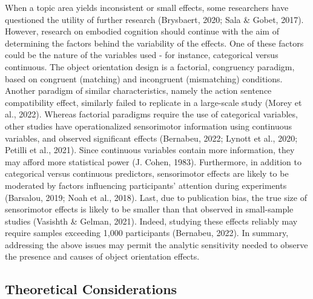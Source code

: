 \documentclass[
  man,floatsintext]{apa7}
\begin{document}
When a topic area yields inconsistent or small effects, some researchers
have questioned the utility of further research (Brysbaert, 2020; Sala \& Gobet, 2017). However, research on embodied cognition should continue with
the aim of determining the factors behind the variability of the
effects. One of these factors could be the nature of the variables
used - for instance, categorical versus continuous. The object
orientation design is a factorial, congruency paradigm, based on
congruent (matching) and incongruent (mismatching) conditions. Another
paradigm of similar characteristics, namely the action sentence
compatibility effect, similarly failed to replicate in a large-scale
study (Morey et al., 2022). Whereas factorial paradigms require the use of
categorical variables, other studies have operationalized sensorimotor
information using continuous variables, and observed significant effects
(Bernabeu, 2022; Lynott et al., 2020; Petilli et al., 2021). Since continuous variables
contain more information, they may afford more statistical power
(J. Cohen, 1983). Furthermore, in addition to categorical versus continuous
predictors, sensorimotor effects are likely to be moderated by factors
influencing participants' attention during experiments
(Barsalou, 2019; Noah et al., 2018). Last, due
to publication bias, the true size of sensorimotor effects is likely to
be smaller than that observed in small-sample studies (Vasishth \& Gelman, 2021).
Indeed, studying these effects reliably may require samples exceeding
1,000 participants (Bernabeu, 2022). In summary, addressing the above
issues may permit the analytic sensitivity needed to observe the
presence and causes of object orientation effects.

\hypertarget{theoretical-considerations}{%
\subsection{Theoretical Considerations}\label{theoretical-considerations}}
\end{document}
